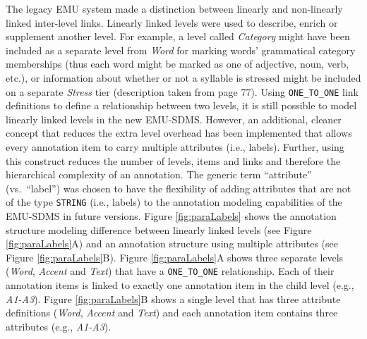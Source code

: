 \documentclass[]{book}
\begin{document}
The legacy EMU system made a distinction between linearly and non-linearly linked inter-level links. Linearly linked levels were used to describe, enrich or supplement another level. For example, a level called \emph{Category} might have been included as a separate level from \emph{Word} for marking words' grammatical category memberships (thus each word might be marked as one of adjective, noun, verb, etc.), or information about whether or not a syllable is stressed might be included on a separate \emph{Stress} tier (description taken from \citet{harrington:2010a} page 77). Using \texttt{ONE\_TO\_ONE} link definitions to define a relationship between two levels, it is still possible to model linearly linked levels in the new EMU-SDMS. However, an additional, cleaner concept that reduces the extra level overhead has been implemented that allows every annotation item to carry multiple attributes (i.e., labels). Further, using this construct reduces the number of levels, items and links and therefore the hierarchical complexity of an annotation. The generic term ``attribute'' (vs.~``label'') was chosen to have the flexibility of adding attributes that are not of the type \texttt{STRING} (i.e., labels) to the annotation modeling capabilities of the EMU-SDMS in future versions. Figure \ref{fig:paraLabels} shows the annotation structure modeling difference between linearly linked levels (see Figure \ref{fig:paraLabels}A) and an annotation structure using multiple attributes (see Figure \ref{fig:paraLabels}B). Figure \ref{fig:paraLabels}A shows three separate levels (\emph{Word}, \emph{Accent} and \emph{Text}) that have a \texttt{ONE\_TO\_ONE} relationship. Each of their annotation items is linked to exactly one annotation item in the child level (e.g., \emph{A1-A3}). Figure \ref{fig:paraLabels}B shows a single level that has three attribute definitions (\emph{Word}, \emph{Accent} and \emph{Text}) and each annotation item contains three attributes (e.g., \emph{A1-A3}).
\end{document}
